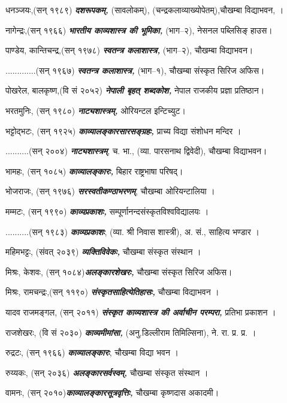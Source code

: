 \documentclass[10pt, a5paper, twoside]{article}
\begin{document}
\begin{flushleft}
धनञ्जयः,(सन् १९८९) \textit{\textbf{दशरूपकम्,}} (सावलोकम्), (चन्द्रकलाव्याख्योपेतम्),चौखम्बा विद्याभवन, ।

नागेन्द्रः,(सन् १९६६)  \textit{\textbf{भारतीय काव्यशास्त्र की भूमिका,}} (भाग–२), नेसनल पब्लिसिङ् हाउस।

पाण्डेय, कान्तिचन्द्र,(सन् १९७८)  \textit{\textbf{स्वतन्त्र कलाशास्त्र,}} (भाग–२), चौखम्बा विद्याभवन।

.............(सन् १९६७) \textit{\textbf{स्वतन्त्र कलाशास्त्र,}} (भाग–१), चौखम्बा संस्कृत सिरिज अफिस।

पोखरेल, बालकृष्ण,(वि सं २०५२) \textit{\textbf{नेपाली बृहत् शब्दकोश,}} नेपाल राजकीय प्रज्ञा प्रतिष्ठान।

भरतमुनिः, (सन् १९८०) \textit{\textbf{नाट्यशास्त्रम्,}}  ओरियन्टल इन्टिच्युट।

भट्टोद्भटः, (सन् १९२५) \textit{\textbf{काव्यालङ्कारसारसङ्ग्रहः,}} प्राच्य विद्या संशोधन मन्दिर ।

..........(सन् २००४) \textit{\textbf{नाट्यशास्त्रम्}}, च. भा., (व्या. पारसनाथ द्विवेदी), चौखम्बा विद्याभवन।

भामहः, (सन् १०८५) \textit{\textbf{काव्यालङ्कारः,}} बिहार राष्ट्रभाषा परिषद्।

भोजराजः, (सन् १९७६) \textit{\textbf{सरस्वतीकण्ठाभरणम्}}, चौखम्बा ओरियन्टालिया ।

मम्मटः, (सन् १९९०) \textit{\textbf{काव्यप्रकाशः,}} सम्पूर्णानन्दसंस्कृतविश्वविद्यालयः  ।

..........(सन् १९८३) \textit{\textbf{काव्यप्रकाशः}}, (व्या. श्री निवास शास्त्री), अ. सं., साहित्य भण्डार ।

महिमभट्टः, (संवत् २०३९) \textit{\textbf{व्यक्तिविवेकः,}} चौखम्बा संस्कृत संस्थान ।

मिश्रः, केशवः,  (सन् १०८४)\textit{\textbf{अलङ्कारशेखरः,}} चौखम्बा संस्कृत सिरिज अफिस।

मिश्रः, रामचन्द्रः,(सन् ११९०) \textit{\textbf{संस्कृतसाहित्येतिहासः,}} चौखम्बा विद्याभवन ।

यादव राजमङ्गल, (सन् २०११) \textit{\textbf{संस्कृत काव्यशास्त्र की अर्वाचीन परम्परा,}} प्रतिभा प्रकाशन ।

राजशेखरः, (वि सं २०३०) \textit{\textbf{काव्यमीमांसा,}} (अनु.डिल्लीराम तिमिल्सिना), ने. रा. प्र. प्र. ।

रुद्रटः, (सन् १९६६) \textit{\textbf{काव्यालङ्कारः}}, चौखम्बा विद्या भवन ।

रुय्यकः, (सन् २०३६) \textit{\textbf{अलङ्कारसर्वस्वम्,}} चौखम्बा संस्कृत संस्थान ।

वामनः, (सन् २०१०)\textit{\textbf{काव्यालङ्कारसूत्रवृत्तिः,}} चौखम्बा कृष्णदास अकादमी।


\end{flushleft}
\end{document}
